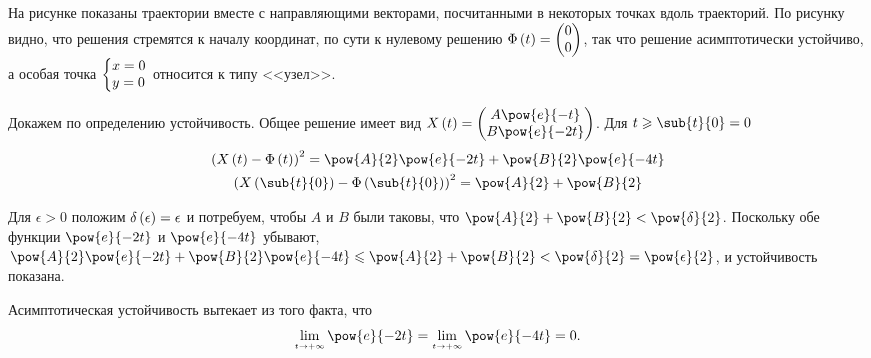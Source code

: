 \documentclass[a5paper,10pt]{article}
\begin{document}
На рисунке показаны траектории вместе с направляющими векторами, посчитанными в 
некоторых точках вдоль траекторий. По рисунку видно, что решения стремятся к началу координат,
по сути к нулевому решению $\Phi\left(\hspace{0.01em}t\hspace{0.01em}\right) = \begin{pmatrix} 0 \\ 0 \end{pmatrix}$,
так что решение асимптотически устойчиво, а особая точка 
$\tsys{x = 0 \\ y = 0}$ относится к типу <<узел>>.

Докажем по определению устойчивость. Общее решение имеет вид 
$X\br{t} = \begin{pmatrix} A \pow{e}{-t} \\ B \pow{e}{-2t} \end{pmatrix}$.
Для $t \ge \sub{t}{0} = 0$
\begin{gather*}
    \br{X\br{t} - \Phi\br{t}}^2 = \pow{A}{2} \pow{e}{-2t} + \pow{B}{2} \pow{e}{-4t} \\
    \br{X\br{\sub{t}{0}} - \Phi\br{\sub{t}{0}}}^2 = \pow{A}{2} + \pow{B}{2}
\end{gather*}

Для $\epsilon > 0$ положим $\delta\left(\hspace{0.01em}\epsilon\hspace{0.01em}\right) = \epsilon$ и потребуем,
чтобы $A$ и $B$ были таковы, что $\pow{A}{2} + \pow{B}{2} < \pow{\delta}{2}$. 
Поскольку обе функции $\pow{e}{-2t}$ и $\pow{e}{-4t}$ убывают, 
$\pow{A}{2} \pow{e}{-2t} + \pow{B}{2} \pow{e}{-4t} 
    \le \pow{A}{2} + \pow{B}{2} < \pow{\delta}{2} = \pow{\epsilon}{2}$,
и устойчивость показана.

Асимптотическая устойчивость вытекает из того факта, что
$$\tlim{\mathsmaller{t \to +\infty}} \pow{e}{-2t} 
    = \tlim{\mathsmaller{t \to +\infty}} \pow{e}{-4t} = 0.$$
\end{document}
